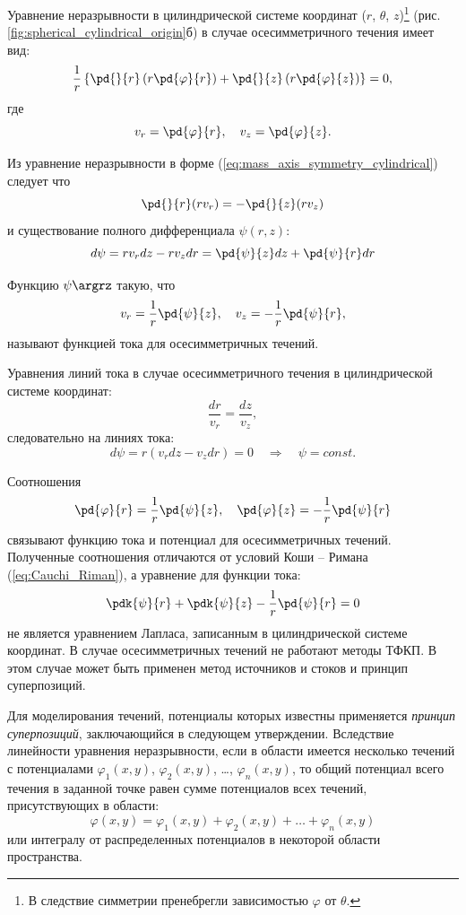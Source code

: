 \documentclass[a4paper, 14pt]{extarticle}
\begin{document}
Уравнение неразрывности в цилиндрической системе координат ($r$, $\theta$, $z$)\footnote{В следствие симметрии пренебрегли зависимостью $\varphi$ от $\theta$.} (рис. \ref{fig:spherical_cylindrical_origin}б) в случае осесимметричного течения имеет вид:
\begin{equation}
\label{eq:mass_axis_symmetry_cylindrical}
\frac{1}{r}
\left\{
\pd{}{r}\left( r \pd{\varphi}{r} \right) + 
\pd{}{z}\left( r \pd{\varphi}{z} \right)
\right\}
= 0,
\end{equation}
где
\[
v_r = \pd{\varphi}{r},\quad
v_z =  \pd{\varphi}{z}.
\]

Из уравнение неразрывности в форме (\ref{eq:mass_axis_symmetry_cylindrical}) следует что
\[
	\pd{}{r}(r v_r)  = -\pd{}{z}(r v_z)
\]	
и существование полного дифференциала $\psi(r,z)$:
\[
	d\psi = r v_r dz - r v_z dr = \pd{\psi}{z} dz + \pd{\psi}{r} dr
\]


\begin{dfn}
Функцию $\psi\argrz$  такую, что
\[
	v_r = \displaystyle\frac{1}{r}\pd{\psi}{z},\quad
	v_z = -\displaystyle\frac{1}{r}\pd{\psi}{r},
\]
называют \alert{функцией тока для осесимметричных течений}.	
\end{dfn}

Уравнения линий тока в случае осесимметричного течения в цилиндрической системе координат:
\[
\frac{dr}{v_r} = \frac{dz}{v_z},
\]
следовательно на линиях тока:
\[
d\psi = r (v_r dz - v_z dr) = 0\quad
\Rightarrow\quad
\psi = const.
\]

Соотношения
\begin{equation}
	\label{eq:phi_psi_connection_sym}
	\pd{\varphi}{r} = \frac{1}{r}\pd{\psi}{z},\quad
	\pd{\varphi}{z} = -\frac{1}{r}\pd{\psi}{r}
\end{equation}
связывают функцию тока и потенциал для осесимметричных течений. Полученные соотношения \alert{отличаются} от условий Коши -- Римана (\ref{eq:Cauchi_Riman}), а уравнение для функции тока:
\[
	\pdk{\psi}{r}+\pdk{\psi}{z} - \frac{1}{r}\pd{\psi}{r} = 0
\]
не является уравнением Лапласа, записанным в цилиндрической системе координат. 
В случае осесимметричных течений не работают методы ТФКП. В этом случае может быть применен \alert{метод источников и стоков} и \alert{принцип суперпозиций}. 
		
Для моделирования течений, потенциалы которых известны применяется \textit{принцип суперпозиций}, заключающийся в следующем утверждении. Вследствие линейности уравнения неразрывности, если в области имеется несколько течений с потенциалами $\varphi_1(x,y)$, $\varphi_2(x,y)$, \ldots, $\varphi_n(x,y)$, то общий потенциал всего течения в заданной точке равен сумме потенциалов всех течений, присутствующих в области:
\[
\varphi(x,y) = \varphi_1(x,y) + \varphi_2(x,y) + \ldots + \varphi_n(x,y)
\] 		
или интегралу от распределенных потенциалов в некоторой области пространства.
\end{document}
